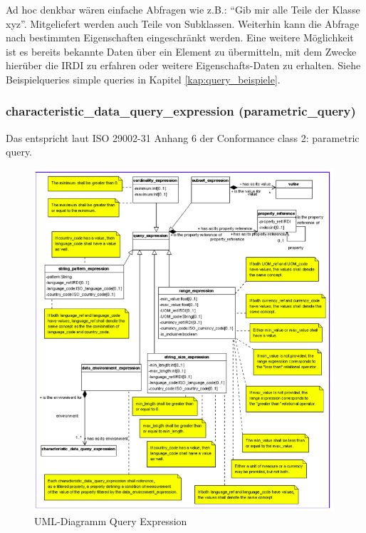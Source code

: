 Ad hoc denkbar wären einfache Abfragen wie z.B.: \enquote{Gib mir alle Teile der Klasse xyz}. Mitgeliefert werden auch Teile von Subklassen. Weiterhin kann die Abfrage nach bestimmten Eigenschaften eingeschränkt werden. Eine weitere Möglichkeit ist es bereits bekannte Daten über ein Element zu übermitteln, mit dem Zwecke hierüber die IRDI zu erfahren oder weitere Eigenschafts-Daten zu erhalten. Siehe Beispielqueries simple queries in Kapitel \ref{kap:query_beispiele}. 

\subsubsection{characteristic\_data\_query\_expression (parametric\_query)}
Das entspricht laut ISO 29002-31 Anhang 6 der Conformance class 2: parametric query.

\begin{figure}[htbp]
	\centering
		\includegraphics[width=0.99\textwidth]{images/query_expression.png}
		\caption[UML-Diagramm Query Expression]{UML-Diagramm Query Expression\footnotemark}
	\label{fig:querymain}
\end{figure}

